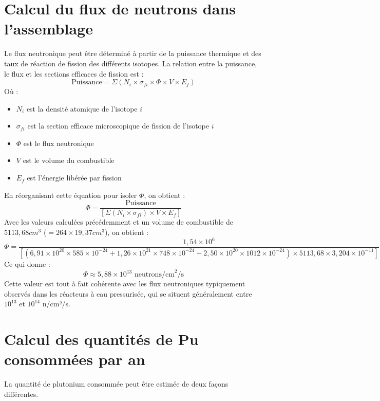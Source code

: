 \documentclass{article}
\begin{document}
\section{Calcul du flux de neutrons dans l'assemblage}
Le flux neutronique peut être déterminé à partir de la puissance thermique et des taux de réaction de fission des différents isotopes.
La relation entre la puissance, le flux et les sections efficaces de fission est :
\begin{equation}
  \text{Puissance} = \Sigma (N_i \times \sigma_{fi} \times \Phi \times V \times E_f)
\end{equation}
Où :
\begin{itemize}
  \item $N_i$ est la densité atomique de l'isotope $i$
  \item $\sigma_{fi}$ est la section efficace microscopique de fission de l'isotope $i$
  \item $\Phi$ est le flux neutronique
  \item $V$ est le volume du combustible
  \item $E_f$ est l'énergie libérée par fission
\end{itemize}
En réorganisant cette équation pour isoler $\Phi$, on obtient :
\begin{equation}
  \Phi = \frac{\text{Puissance}}{[\Sigma (N_i \times \sigma_{fi}) \times V \times E_f]}
\end{equation}
Avec les valeurs calculées précédemment et un volume de combustible de $5 113,68 cm^3$ ($= 264 \times 19,37 cm^3$), on obtient :
\begin{equation}
  \Phi = \frac{1,54 \times 10^6}{[(6,91 \times 10^{20} \times 585 \times 10^{-24} + 1,26 \times 10^{21} \times 748 \times 10^{-24} + 2,50 \times 10^{20} \times 1012 \times 10^{-24}) \times 5 113,68 \times 3,204 \times 10^{-11}]}
\end{equation}
Ce qui donne :
\begin{equation}
  \Phi \approx 5,88 \times 10^{13} \text{ neutrons/cm}^2/\text{s}
\end{equation}
Cette valeur est tout à fait cohérente avec les flux neutroniques typiquement observés dans les réacteurs à eau pressurisée, qui se situent généralement entre $10^{13}$ et $10^{14}$ n/cm²/s.

\section{Calcul des quantités de Pu consommées par an}
La quantité de plutonium consommée peut être estimée de deux façons différentes.
\end{document}

